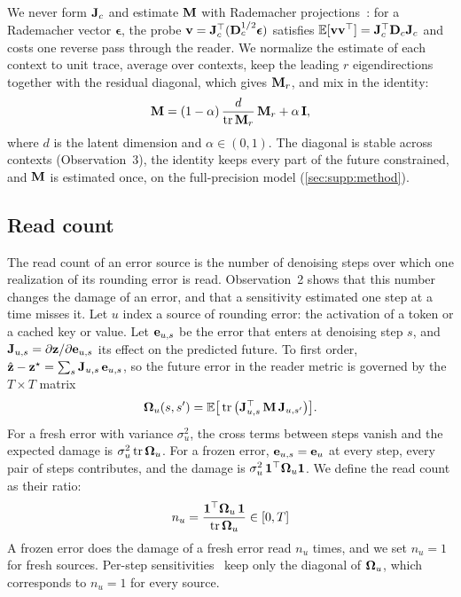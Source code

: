 We never form $\mathbf{J}_c$ and estimate $\mathbf{M}$ with Rademacher projections~\cite{hutchinson1989trace}: for a Rademacher vector $\boldsymbol{\epsilon}$, the probe $\mathbf{v} = \mathbf{J}_c^\top(\mathbf{D}_c^{1/2}\boldsymbol{\epsilon})$ satisfies $\mathbb{E}[\mathbf{v}\mathbf{v}^\top] = \mathbf{J}_c^\top \mathbf{D}_c \mathbf{J}_c$ and costs one reverse pass through the reader.
We normalize the estimate of each context to unit trace, average over contexts, keep the leading $r$ eigendirections together with the residual diagonal, which gives $\mathbf{M}_r$, and mix in the identity:
\begin{equation}
  \mathbf{M} = (1-\alpha)\,\frac{d}{\operatorname{tr} \mathbf{M}_r}\,\mathbf{M}_r + \alpha\,\mathbf{I},
  \label{eq:metric-form}
\end{equation}
where $d$ is the latent dimension and $\alpha \in (0, 1)$.
The diagonal is stable across contexts (Observation~3), the identity keeps every part of the future constrained, and $\mathbf{M}$ is estimated once, on the full-precision model (\cref{sec:supp:method}).

\subsection{Read count}
\label{sec:method:count}

The read count of an error source is the number of denoising steps over which one realization of its rounding error is read.
Observation~2 shows that this number changes the damage of an error, and that a sensitivity estimated one step at a time misses it.
Let $u$ index a source of rounding error: the activation of a token or a cached key or value.
Let $\mathbf{e}_{u,s}$ be the error that enters at denoising step $s$, and $\mathbf{J}_{u,s} = \partial\mathbf{z}/\partial\mathbf{e}_{u,s}$ its effect on the predicted future.
To first order, $\hat{\mathbf{z}} - \mathbf{z}^\star = \sum_s \mathbf{J}_{u,s}\,\mathbf{e}_{u,s}$, so the future error in the reader metric is governed by the $T \times T$ matrix
\begin{equation}
  \boldsymbol{\Omega}_u(s, s') = \mathbb{E}\big[\operatorname{tr}\big(\mathbf{J}_{u,s}^\top\, \mathbf{M}\, \mathbf{J}_{u,s'}\big)\big].
  \label{eq:kernel}
\end{equation}
For a fresh error with variance $\sigma_u^2$, the cross terms between steps vanish and the expected damage is $\sigma_u^2 \operatorname{tr}\boldsymbol{\Omega}_u$.
For a frozen error, $\mathbf{e}_{u,s} = \mathbf{e}_u$ at every step, every pair of steps contributes, and the damage is $\sigma_u^2\, \mathbf{1}^\top \boldsymbol{\Omega}_u \mathbf{1}$.
We define the read count as their ratio:
\begin{equation}
  n_u = \frac{\mathbf{1}^\top \boldsymbol{\Omega}_u\, \mathbf{1}}{\operatorname{tr} \boldsymbol{\Omega}_u} \in [0, T]
  \label{eq:count}
\end{equation}
A frozen error does the damage of a fresh error read $n_u$ times, and we set $n_u = 1$ for fresh sources.
Per-step sensitivities~\cite{akbari2026qwam,wang2026steerquant} keep only the diagonal of $\boldsymbol{\Omega}_u$, which corresponds to $n_u = 1$ for every source.

